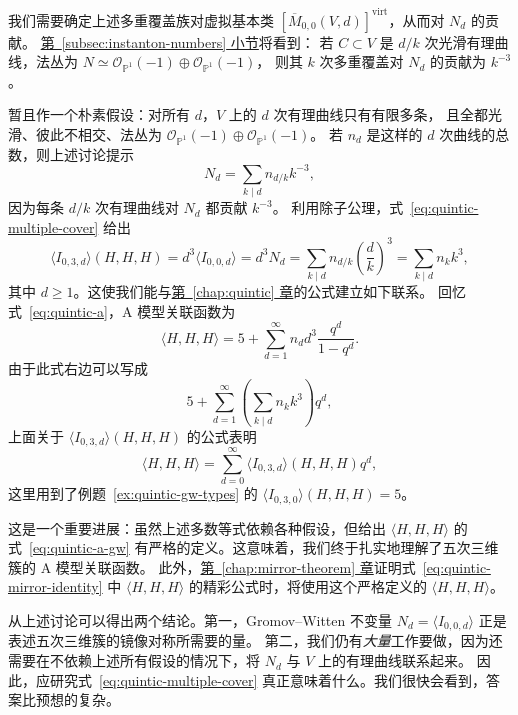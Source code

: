 我们需要确定上述多重覆盖族对虚拟基本类 $[\overline M_{0,0}(V,d)]^{\mathrm{virt}}$，从而对 $N_d$ 的贡献。
\hyperref[subsec:instanton-numbers]{第~\ref*{subsec:instanton-numbers} 小节}将看到：
若 $C\subset V$ 是 $d/k$ 次光滑有理曲线，法丛为
$N\simeq\mathcal O_{\mathbb P^1}(-1)\oplus\mathcal O_{\mathbb P^1}(-1)$，
则其 $k$ 次多重覆盖对 $N_d$ 的贡献为 $k^{-3}$。

暂且作一个朴素假设：对所有 $d$，$V$ 上的 $d$ 次有理曲线只有有限多条，
且全都光滑、彼此不相交、法丛为 $\mathcal O_{\mathbb P^1}(-1)\oplus\mathcal O_{\mathbb P^1}(-1)$。
若 $n_d$ 是这样的 $d$ 次曲线的总数，则上述讨论提示
\begin{equation}\label{eq:quintic-multiple-cover}
N_d=\sum_{k\mid d}n_{d/k}k^{-3},
\end{equation}
因为每条 $d/k$ 次有理曲线对 $N_d$ 都贡献 $k^{-3}$。
利用除子公理，式~\eqref{eq:quintic-multiple-cover} 给出
\begin{equation}\label{eq:quintic-three-divisors}
\langle I_{0,3,d}\rangle(H,H,H)=d^3\langle I_{0,0,d}\rangle=d^3N_d
=\sum_{k\mid d}n_{d/k}\left(\frac d k\right)^3=\sum_{k\mid d}n_kk^3,
\end{equation}
其中 $d\geq1$。这使我们能与\hyperref[chap:quintic]{第~\ref*{chap:quintic} 章}的公式建立如下联系。
回忆式~\eqref{eq:quintic-a}，A 模型关联函数为
\begin{equation}\label{eq:quintic-a-instanton}
\langle H,H,H\rangle=5+\sum_{d=1}^{\infty}n_dd^3\frac{q^d}{1-q^d}.
\end{equation}
由于此式右边可以写成
\[
5+\sum_{d=1}^{\infty}\left(\sum_{k\mid d}n_kk^3\right)q^d,
\]
上面关于 $\langle I_{0,3,d}\rangle(H,H,H)$ 的公式表明
\begin{equation}\label{eq:quintic-a-gw}
\langle H,H,H\rangle=\sum_{d=0}^{\infty}\langle I_{0,3,d}\rangle(H,H,H)q^d,
\end{equation}
这里用到了例题~\ref{ex:quintic-gw-types} 的 $\langle I_{0,3,0}\rangle(H,H,H)=5$。

这是一个重要进展：虽然上述多数等式依赖各种假设，但给出 $\langle H,H,H\rangle$
的式~\eqref{eq:quintic-a-gw} 有严格的定义。这意味着，我们终于扎实地理解了五次三维簇的 A 模型关联函数。
此外，\hyperref[chap:mirror-theorem]{第~\ref*{chap:mirror-theorem} 章}证明式~\eqref{eq:quintic-mirror-identity} 中 $\langle H,H,H\rangle$ 的精彩公式时，将使用这个严格定义的 $\langle H,H,H\rangle$。

从上述讨论可以得出两个结论。第一，Gromov--Witten 不变量 $N_d=\langle I_{0,0,d}\rangle$
正是表述五次三维簇的镜像对称所需要的量。
第二，我们仍有\emph{大量}工作要做，因为还需要在不依赖上述所有假设的情况下，将 $N_d$ 与 $V$ 上的有理曲线联系起来。
因此，应研究式~\eqref{eq:quintic-multiple-cover} 真正意味着什么。我们很快会看到，答案比预想的复杂。

